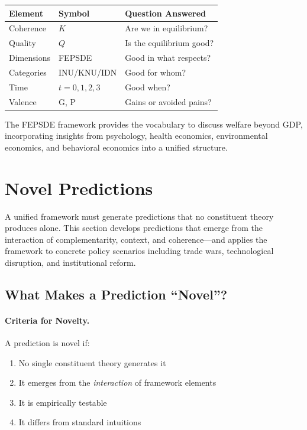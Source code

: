 \documentclass[12pt,a4paper]{article}
\begin{document}
\begin{center}
\renewcommand{\arraystretch}{1.4}
\begin{tabular}{lll}
\hline
\textbf{Element} & \textbf{Symbol} & \textbf{Question Answered} \\
\hline
Coherence & $K$ & Are we in equilibrium? \\
Quality & $Q$ & Is the equilibrium good? \\
Dimensions & FEPSDE & Good in what respects? \\
Categories & INU/KNU/IDN & Good for whom? \\
Time & $t = 0,1,2,3$ & Good when? \\
Valence & G, P & Gains or avoided pains? \\
\hline
\end{tabular}
\end{center}

The FEPSDE framework provides the vocabulary to discuss welfare
beyond GDP, incorporating insights from psychology, health economics,
environmental economics, and behavioral economics
into a unified structure.

\section{Novel Predictions}
\label{sec:novelpredictions}
\label{sec:predictions}

A unified framework must generate predictions that no constituent theory 
produces alone. This section develops predictions that emerge from the
interaction of complementarity, context, and coherence---and applies
the framework to concrete policy scenarios including trade wars,
technological disruption, and institutional reform.

\subsection{What Makes a Prediction ``Novel''?}

\paragraph{Criteria for Novelty.}
A prediction is novel if:
\begin{enumerate}
  \item No single constituent theory generates it
  \item It emerges from the \emph{interaction} of framework elements
  \item It is empirically testable
  \item It differs from standard intuitions
\end{enumerate}
\end{document}
